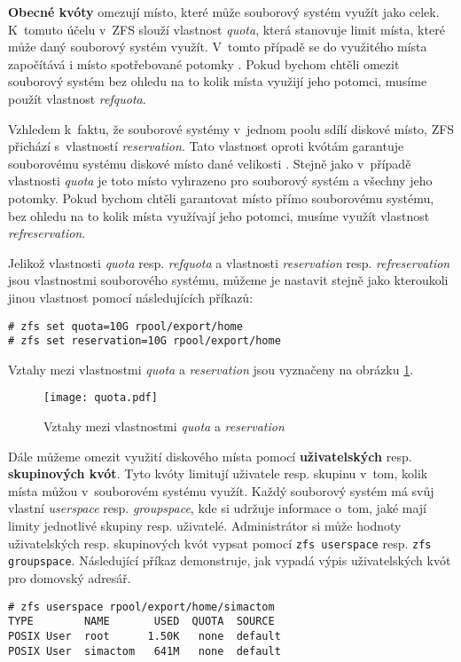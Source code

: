 \textbf{Obecné kvóty} omezují místo, které může souborový systém využít jako celek. K~tomuto účelu v~ZFS slouží vlastnost \emph{quota}, která stanovuje limit místa, které může daný souborový systém využít. V~tomto případě se do využitého místa započítává i místo spotřebované potomky \cite{quotas}. Pokud bychom chtěli omezit souborový systém bez ohledu na to kolik místa využijí jeho potomci, musíme použít vlastnost \emph{refquota}.

Vzhledem k~faktu, že souborové systémy v~jednom poolu sdílí diskové místo, ZFS přichází s~vlastností \emph{reservation}. Tato vlastnost oproti kvótám garantuje souborovému systému diskové místo dané velikosti \cite{quotas}. Stejně jako v~případě vlastnosti \emph{quota} je toto místo vyhrazeno pro souborový systém a všechny jeho potomky. Pokud bychom chtěli garantovat místo přímo souborovému systému, bez ohledu na to kolik místa využívají jeho potomci, musíme využít vlastnost \emph{refreservation}.

Jelikož vlastnosti \emph{quota} resp. \emph{refquota} a vlastnosti \emph{reservation} resp. \emph{refreservation} jsou vlastnostmi souborového systému, můžeme je nastavit stejně jako kteroukoli jinou vlastnost pomocí následujících příkazů:
\begin{verbatim}
# zfs set quota=10G rpool/export/home
# zfs set reservation=10G rpool/export/home
\end{verbatim}

Vztahy mezi vlastnostmi \emph{quota} a \emph{reservation} jsou vyznačeny na obrázku \ref{quotavsreserv}.
\begin{figure}
    \centering
    \texttt{[image: quota.pdf]}
    \caption{Vztahy mezi vlastnostmi \emph{quota} a \emph{reservation}}
    \label{quotavsreserv}
\end{figure}

Dále můžeme omezit využití diskového místa pomocí \textbf{uživatelských} resp. \textbf{skupinových kvót}. Tyto kvóty limitují uživatele resp. skupinu v~tom, kolik místa můžou v~souborovém systému využít. Každý souborový systém má svůj vlastní \emph{userspace} resp. \emph{groupspace}, kde si udržuje informace o~tom, jaké mají limity jednotlivé skupiny resp. uživatelé.
Administrátor si může hodnoty uživatelských resp. skupinových kvót vypsat pomocí \verb|zfs userspace| resp. \verb|zfs groupspace|. Následující příkaz demonstruje, jak vypadá výpis uživatelských kvót pro domovský adresář.
\begin{verbatim}
# zfs userspace rpool/export/home/simactom
TYPE        NAME       USED  QUOTA  SOURCE
POSIX User  root      1.50K   none  default
POSIX User  simactom   641M   none  default
\end{verbatim}

